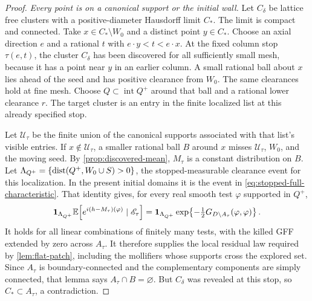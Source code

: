 \begin{proof}
\emph{Every point is on a canonical support or the initial wall.}
Let \(C_\delta\) be lattice free clusters with a positive-diameter
Hausdorff limit \(C_*\). The limit is compact and connected.
Take \(x\in C_*\setminus W_0\) and a distinct point \(y\in C_*\).
Choose an axial direction \(e\) and a rational \(t\) with
\(e\cdot y<t<e\cdot x\). At the fixed column stop \(\tau(e,t)\),
the cluster \(C_\delta\) has been discovered for all sufficiently
small mesh, because it has a point near \(y\) in an earlier column.
A small rational ball about \(x\) lies ahead of the seed and has
positive clearance from \(W_0\). The same clearances hold at fine mesh.
Choose \(Q\subset\operatorname{int}Q^+\) around that ball and a rational
lower clearance \(r\). The target cluster is an entry in the finite
localized list at this already specified stop.

Let \(\mathcal U_\tau\) be the finite union of the canonical supports
associated with that list's visible entries. If \(x\notin\mathcal U_\tau\),
a smaller rational ball \(B\) around \(x\) misses \(\mathcal U_\tau\),
\(W_0\), and the moving seed. By \cref{prop:discovered-mean},
\(M_\tau\) is a constant distribution on \(B\).
Let \(\Lambda_{Q^+}=\{\operatorname{dist}(Q^+,W_0\cup S)>0\}\), the
stopped-measurable clearance event for this localization. In the
present initial domains it is the event in
\cref{eq:stopped-full-characteristic}. That identity gives, for every
real smooth test \(\varphi\) supported in \(Q^+\),
\begin{equation}
 \mathbf 1_{\Lambda_{Q^+}}
 \mathbb E\!\left[e^{i(h-M_\tau)(\varphi)}\mid\mathscr E_\tau\right]
 =\mathbf 1_{\Lambda_{Q^+}}\exp\!\left\{-\tfrac12
       G_{D\setminus A_\tau}(\varphi,\varphi)\right\}.
 \label{eq:full-residual-use}
\end{equation}
It holds for all linear combinations of finitely many tests, with the
killed GFF extended by zero across \(A_\tau\). It therefore supplies
the local residual law required by \cref{lem:flat-patch}, including
the mollifiers whose supports cross the explored set. Since \(A_\tau\) is
boundary-connected and the complementary components are simply connected, that lemma
says \(A_\tau\cap B=\varnothing\). But \(C_\delta\) was revealed at
this stop, so \(C_*\subset A_\tau\), a contradiction.


\end{proof}
